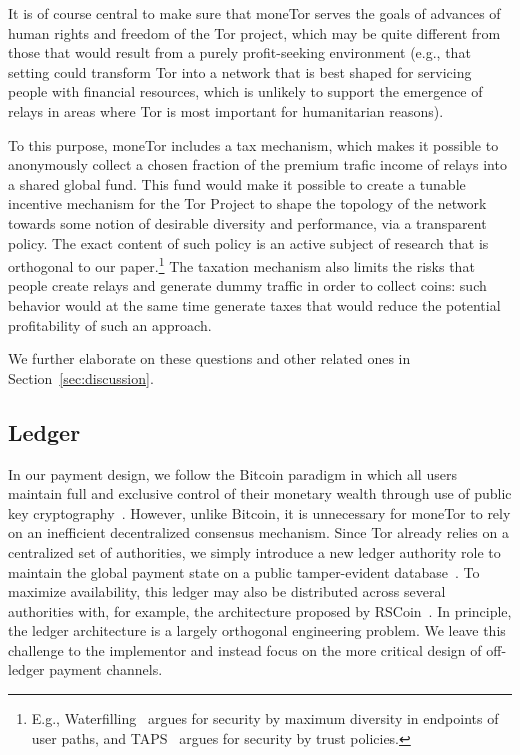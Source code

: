 It is of course central to make sure that moneTor serves the goals of advances of human rights and freedom of the Tor project, which may be quite different from those that would result from a purely profit-seeking environment (e.g., that setting could transform Tor into a network that is best shaped for servicing people with financial resources, which is unlikely to support the emergence of relays in areas where Tor is most important for humanitarian reasons).

To this purpose, moneTor includes a tax mechanism, which makes it possible to anonymously collect a chosen fraction of the premium trafic income of relays into a shared global fund.
This fund would make it possible to create a tunable incentive mechanism for the Tor Project to shape the topology of the network towards some notion of desirable diversity and performance, via a transparent policy.
The exact content of such policy is an active subject of research that is orthogonal to our paper.\footnote{E.g., Waterfilling~\cite{waterfilling-pets2017} argues for security by maximum diversity in endpoints of user paths, and TAPS~\cite{taps-ndss2017} argues for security by trust policies.}
The taxation mechanism also limits the risks that people create relays and generate dummy traffic in order to collect coins: such behavior would at the same time generate taxes that would reduce the potential profitability of such an approach.

We further elaborate on these questions and other related ones in
Section~\ref{sec:discussion}.

\subsection{Ledger}

In our payment design, we follow the Bitcoin paradigm in which all users maintain full and exclusive control of their monetary wealth through use of public key cryptography~\cite{nakamoto2008bitcoin}.
However, unlike Bitcoin, it is unnecessary for moneTor to rely on an inefficient decentralized consensus mechanism.
Since Tor already relies on a centralized set of authorities, we simply introduce a new ledger authority role to maintain the global payment state on a public tamper-evident database~\cite{crosby2009efficient}.
To maximize availability, this ledger may also be distributed across several authorities with, for example, the architecture proposed by RSCoin~\cite{danezis2015centrally}.
In principle, the ledger architecture is a largely orthogonal engineering problem.
We leave this challenge to the implementor and instead focus on the more critical design of off-ledger payment channels.

